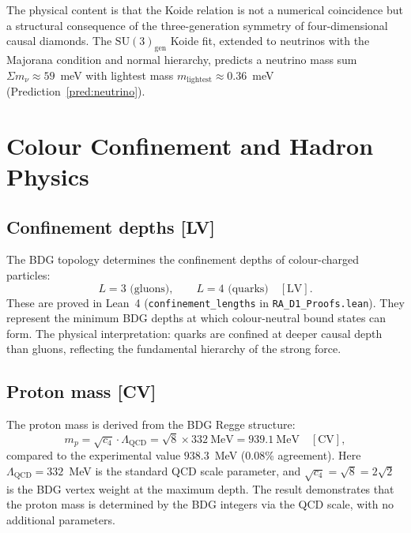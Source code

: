 \documentclass[12pt,a4paper]{article}
\begin{document}
The physical content is that the Koide relation is not a numerical coincidence but a structural consequence of the three-generation symmetry of four-dimensional causal diamonds. The $\mathrm{SU}(3)_{\mathrm{gen}}$ Koide fit, extended to neutrinos with the Majorana condition and normal hierarchy, predicts a neutrino mass sum $\Sigma m_\nu \approx 59$~meV with lightest mass $m_{\mathrm{lightest}} \approx 0.36$~meV (Prediction~\ref{pred:neutrino}).

\section{Colour Confinement and Hadron Physics}\label{sec:hadrons}

\subsection{Confinement depths [LV]}\label{sec:confinement}

The BDG topology determines the confinement depths of colour-charged particles:
\begin{equation}
L = 3 \text{ (gluons)}, \qquad L = 4 \text{ (quarks)} \quad[\text{LV}].
\label{eq:confinement}
\end{equation}
These are proved in Lean~4 (\texttt{confinement\_lengths} in \texttt{RA\_D1\_Proofs.lean}). They represent the minimum BDG depths at which colour-neutral bound states can form. The physical interpretation: quarks are confined at deeper causal depth than gluons, reflecting the fundamental hierarchy of the strong force.

\subsection{Proton mass [CV]}\label{sec:proton}

The proton mass is derived from the BDG Regge structure:
\begin{equation}
m_p = \sqrt{c_4} \cdot \Lambda_{\mathrm{QCD}} = \sqrt{8} \times 332~\mathrm{MeV} = 939.1~\mathrm{MeV} \quad[\text{CV}],
\label{eq:proton}
\end{equation}
compared to the experimental value $938.3$~MeV (0.08\% agreement). Here $\Lambda_{\mathrm{QCD}} = 332$~MeV is the standard QCD scale parameter, and $\sqrt{c_4} = \sqrt{8} = 2\sqrt{2}$ is the BDG vertex weight at the maximum depth. The result demonstrates that the proton mass is determined by the BDG integers via the QCD scale, with no additional parameters.
\end{document}
